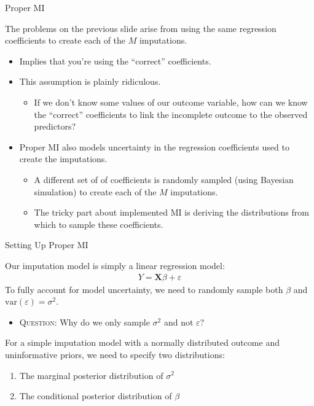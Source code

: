 \documentclass{beamer}\usepackage[]{graphicx}\usepackage[]{color}
\begin{document}
\begin{frame}{Proper MI}
  
  The problems on the previous slide arise from using the same regression 
  coefficients to create each of the $M$ imputations.
  \begin{itemize}
  \item Implies that you're using the ``correct'' coefficients.
    \vb
  \item This assumption is plainly ridiculous.
    \begin{itemize}
    \item If we don't know some values of our outcome variable, how can we know 
      the ``correct'' coefficients to link the incomplete outcome to the 
      observed predictors?
    \end{itemize}
    \vb
    \pause
  \item Proper MI also models uncertainty in the regression coefficients used to 
    create the imputations.
    \begin{itemize}
    \item A different set of of coefficients is randomly sampled (using Bayesian 
      simulation) to create each of the $M$ imputations.
      \vc
    \item The tricky part about implemented MI is deriving the distributions 
      from which to sample these coefficients.
    \end{itemize}
  \end{itemize}
  
\end{frame}


\begin{frame}{Setting Up Proper MI}
  
  Our imputation model is simply a linear regression model:
  \begin{align*}
    Y = \mathbf{X} \beta + \varepsilon
  \end{align*}
  To fully account for model uncertainty, we need to randomly sample both 
  $\beta$ and $\text{var}(\varepsilon) = \sigma^2$.
  \begin{itemize}
  \item \textsc{Question:} Why do we only sample $\sigma^2$ and not 
    $\varepsilon$?
  \end{itemize}
  \pause
  \va
  For a simple imputation model with a normally distributed outcome and 
  uninformative priors, we need to specify two distributions:
  \begin{enumerate}
    \item The marginal posterior distribution of $\sigma^2$
    \item The conditional posterior distribution of $\beta$ 
  \end{enumerate}
  
\end{frame}
\end{document}

